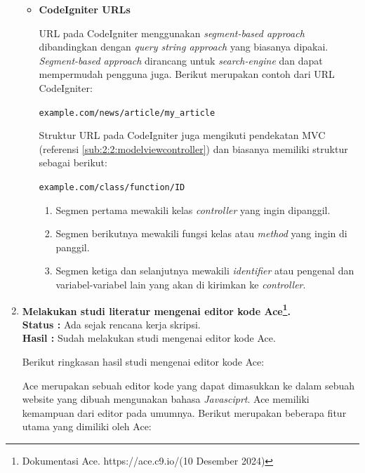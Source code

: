 \documentclass[a4paper,twoside]{article}
\begin{document}
\begin{enumerate}
\begin{itemize}
		      \item \textbf{CodeIgniter URLs}
		            \label{sub:2:2:codeigniterurls}

		            URL pada CodeIgniter menggunakan \textit{segment-based approach} dibandingkan dengan \textit{query string approach} yang biasanya dipakai. \textit{Segment-based approach} dirancang untuk \textit{search-engine} dan dapat mempermudah pengguna juga. Berikut merupakan contoh dari URL CodeIgniter:

		            \begin{center}
			            \verb|example.com/news/article/my_article|
		            \end{center}

		            Struktur URL pada CodeIgniter juga mengikuti pendekatan MVC (referensi \ref{sub:2:2:modelviewcontroller}) dan biasanya memiliki struktur sebagai berikut:

		            \begin{center}
			            \verb|example.com/class/function/ID|
		            \end{center}

		            \begin{enumerate}
			            \item Segmen pertama mewakili kelas \textit{controller} yang ingin dipanggil.
			            \item Segmen berikutnya mewakili fungsi kelas atau \textit{method} yang ingin di panggil.
			            \item Segmen ketiga dan selanjutnya mewakili \textit{identifier} atau pengenal dan variabel-variabel lain yang akan di kirimkan ke \textit{controller}.
		            \end{enumerate}
	      \end{itemize}

	\item \textbf{Melakukan studi literatur mengenai editor kode Ace\footnote{Dokumentasi Ace. https://ace.c9.io/(10 Desember 2024)}.} \\
	      {\bf Status :} Ada sejak rencana kerja skripsi.\\
	      {\bf Hasil :} Sudah melakukan studi mengenai editor kode Ace.

	      Berikut ringkasan hasil studi mengenai editor kode Ace:

	      Ace merupakan sebuah editor kode yang dapat dimasukkan ke dalam sebuah website yang dibuah mengunakan bahasa \textit{Javasciprt}. Ace memiliki kemampuan dari editor pada umumnya. Berikut merupakan beberapa fitur utama yang dimiliki oleh Ace:


\end{enumerate}
\end{document}
